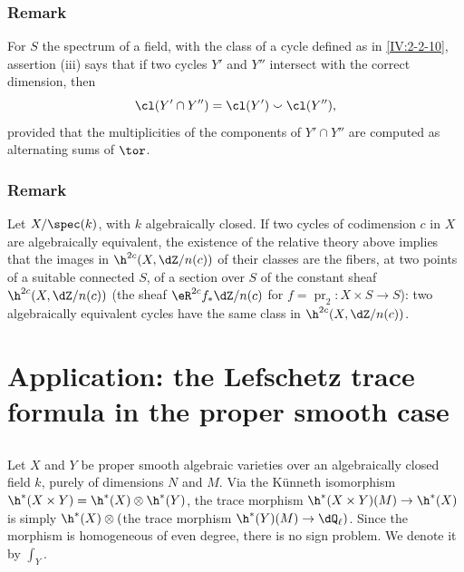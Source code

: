 \subsubsection{Remark}\label{IV:2-3-9}

For $S$ the spectrum of a field, with the class of a cycle defined as in
\ref{IV:2-2-10}, assertion (iii) says that if two cycles $Y'$ and $Y''$
intersect with the correct dimension, then
\[
  \cl(Y'\cap Y'') = \cl(Y')\smallsmile \cl(Y'')\text{,}
\]
provided that the multiplicities of the components of $Y'\cap Y''$ are
computed as alternating sums of $\tor$.






\subsubsection{Remark}\label{IV:2-3-10}

Let $X/\spec(k)$, with $k$ algebraically closed. If two cycles of codimension
$c$ in $X$ are algebraically equivalent, the existence of the relative
theory above implies that the images in $\h^{2 c}(X,\dZ/n(c))$ of their
classes are the fibers, at two points of a suitable connected $S$, of a
section over $S$ of the constant sheaf $\h^{2 c}(X,\dZ/n(c))$ (the sheaf
$\eR^{2 c} f_\ast \dZ/n(c)$ for
$f=\operatorname{pr}_2:X\times S\to S$): two algebraically equivalent cycles
have the same class in $\h^{2 c}(X,\dZ/n(c))$.





















\section{Application: the Lefschetz trace formula in the proper smooth case}\label{IV:3}






\subsection{}\label{IV:3-1}

Let $X$ and $Y$ be proper smooth algebraic varieties over an algebraically
closed field $k$, purely of dimensions $N$ and $M$. Via the K\"unneth
isomorphism $\h^*(X\times Y)=\h^*(X)\otimes \h^*(Y)$, the
trace morphism $\h^*(X\times Y)(M)\to \h^*(X)$ is simply
$\h^*(X)\otimes ($the trace morphism
$\h^*(Y)(M)\to \dQ_\ell)$. Since the morphism is homogeneous of even
degree, there is no sign problem. We denote it by $\int_Y$.






